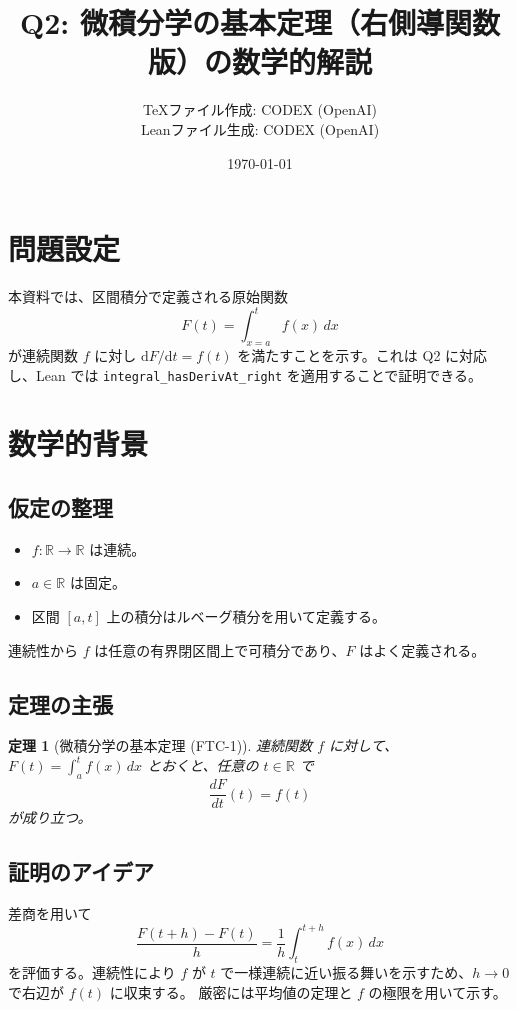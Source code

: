\documentclass[12pt]{ltjsarticle}
\title{Q2: 微積分学の基本定理（右側導関数版）の数学的解説}
\author{TeXファイル作成: CODEX (OpenAI)\\Leanファイル生成: CODEX (OpenAI)}
\date{\today}
\theoremstyle{definition}
\theoremstyle{plain}
\newtheorem{theorem}{定理}
\begin{document}
\maketitle

\section{問題設定}
本資料では、区間積分で定義される原始関数
\begin{equation}
F(t) = \int_{x = a}^{t} f(x)\,dx
\end{equation}
が連続関数 $f$ に対し $\mathrm{d}F/\mathrm{d}t = f(t)$ を満たすことを示す。これは Q2 に対応し、Lean では\newline
\texttt{integral\_hasDerivAt\_right}
を適用することで証明できる。

\section{数学的背景}
\subsection{仮定の整理}
\begin{itemize}
  \item $f\colon \mathbb{R} \to \mathbb{R}$ は連続。
  \item $a \in \mathbb{R}$ は固定。
  \item 区間 $[a, t]$ 上の積分はルベーグ積分を用いて定義する。
\end{itemize}
連続性から $f$ は任意の有界閉区間上で可積分であり、$F$ はよく定義される。

\subsection{定理の主張}
\begin{theorem}[微積分学の基本定理 (FTC-1)]
連続関数 $f$ に対して、$F(t) = \int_{a}^{t} f(x)\,dx$ とおくと、任意の $t \in \mathbb{R}$ で
\begin{equation}
\frac{dF}{dt}(t) = f(t)
\end{equation}
が成り立つ。
\end{theorem}

\subsection{証明のアイデア}
差商を用いて
\begin{equation}
\frac{F(t+h) - F(t)}{h} = \frac{1}{h}\int_{t}^{t+h} f(x)\,dx
\end{equation}
を評価する。連続性により $f$ が $t$ で一様連続に近い振る舞いを示すため、$h \to 0$ で右辺が $f(t)$ に収束する。
厳密には平均値の定理と $f$ の極限を用いて示す。
\end{document}
